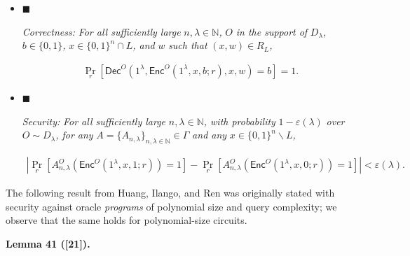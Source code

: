 \documentclass[10pt,a4paper]{article}
\begin{document}
\begin{itemize}


\item[] 
$\blacksquare$ 


\emph{Correctness:}\emph{ For all sufficiently large }$n,\lambda\in\mathbb{N}$\emph{, }$O$\emph{ in the support of }$D_{\lambda}$\emph{, }$b\in\{0,1\}$\emph{, }$x\in\{0,1\}^{n}\cap L$\emph{, and }$w$\emph{ such that }$(x,w)\in R_{L}$\emph{,}\par


\[\begin{gathered}
\Pr_{r}\left[{\mathsf{Dec}}^{O}(1^{\lambda},{\mathsf{Enc}}^{O}(1^{\lambda},x,b;r),x,w)=b\right]=1.
\end{gathered}\]





\item[] 
$\blacksquare$ 


\emph{Security:}\emph{ For all sufficiently large }$n,\lambda\in\mathbb{N}$\emph{, with probability }$1-\varepsilon(\lambda)$\emph{ over }$O\sim D_{\lambda}$\emph{, for any }$A=\{A_{n,\lambda}\}_{n,\lambda\in\mathbb{N}}\in\Gamma$\emph{ and any }$x\in\{0,1\}^{n}\backslash L$\emph{,}\par


\[\begin{gathered}
\left|\Pr_{r}[A_{n,\lambda}^{O}({\mathsf{Enc}}^{O}(1^{\lambda},x,1;r))=1]-\Pr_{r}[A_{n,\lambda}^{O}({\mathsf{Enc}}^{O}(1^{\lambda},x,0;r))=1]\right|<\varepsilon(\lambda).
\end{gathered}\]





\end{itemize}






The following result from Huang, Ilango, and Ren was originally stated with security against oracle \emph{programs} of polynomial size and query complexity; we observe that the same holds for polynomial-size circuits.\par





\par\medskip\noindent\textbf{
\textbf{Lemma 41}\textbf{ }([21])\textbf{.}
}\par
\end{document}
